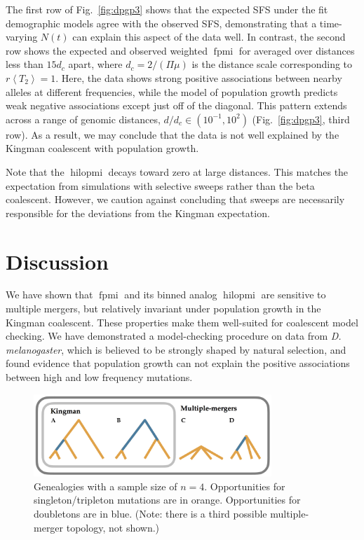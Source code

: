 \documentclass[11pt, letterpaper]{article}   	%
\newcommand{\fig}[1]{Fig.~\ref{#1}}
\newcommand{\E}[1]{\left< #1 \right>}
\DeclareMathOperator{\fpmi}{fpmi}
\DeclareMathOperator{\hilopmi}{hilopmi}
\begin{document}
The first row of \fig{fig:dpgp3} shows that the expected SFS under the fit demographic models agree with the observed SFS, demonstrating that a time-varying $N(t)$ can explain this aspect of the data well.
In contrast, the second row shows the expected and observed weighted $\fpmi$ for averaged over distances less than $15 d_c$ apart, where $d_c = 2/ (\Pi \mu)$ is the distance scale corresponding to $r\E{T_2} = 1$.
Here, the data shows strong positive associations between nearby alleles at different frequencies, while the model of population growth predicts weak negative associations except just off of the diagonal.
This pattern extends across a range of genomic distances, $d/d_c \in (10^{-1}, 10^2)$ (\fig{fig:dpgp3}, third row).
As a result, we may conclude that the data is not well explained by the Kingman coalescent with population growth.

Note that the $\hilopmi$ decays toward zero at large distances.
This matches the expectation from simulations with selective sweeps rather than the beta coalescent.
However, we caution against concluding that sweeps are necessarily responsible for the deviations from the Kingman expectation.


\section*{Discussion}

We have shown that $\fpmi$ and its binned analog $\hilopmi$ are sensitive to multiple mergers, but relatively invariant under population growth in the Kingman coalescent.
These properties make them well-suited for coalescent model checking.
We have demonstrated a model-checking procedure on data from \textit{D. melanogaster}, which is believed to be strongly shaped by natural selection, and found evidence that population growth can not explain the positive associations between high and low frequency mutations.

\begin{figure}
\centering
\includegraphics[width=0.8\textwidth]{figures/trees.png}
\caption{Genealogies with a sample size of $n=4$. Opportunities for singleton/tripleton mutations are in orange. Opportunities for doubletons are in blue. (Note: there is a third possible multiple-merger topology, not shown.) \label{fig:trees}}
\end{figure}
\end{document}
